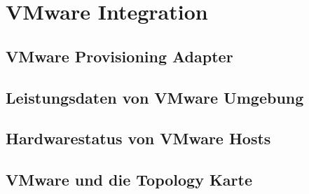 \section{VMware Integration}

\subsection{VMware Provisioning Adapter}

\subsection{Leistungsdaten von VMware Umgebung}

\subsection{Hardwarestatus von VMware Hosts}

\subsection{VMware und die Topology Karte}
